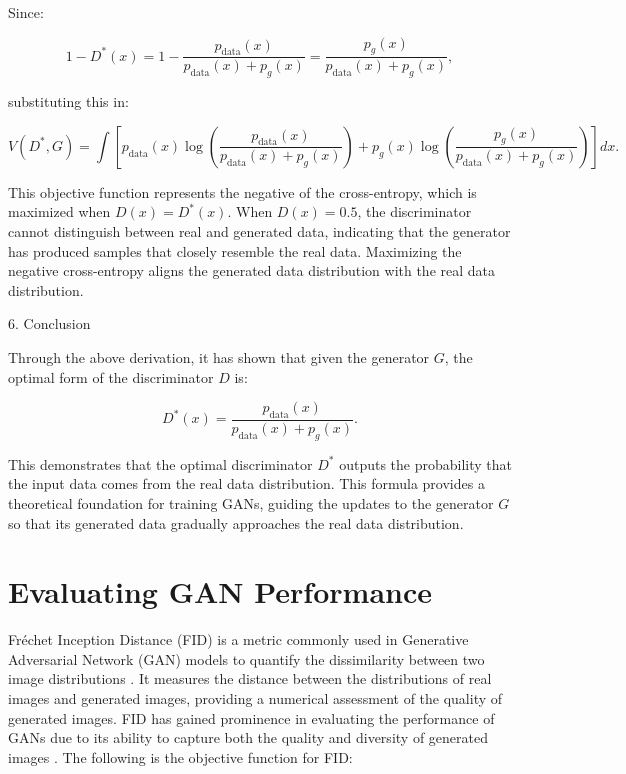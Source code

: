 Since:

\begin{equation}
    1 - D^*(x) = 1 - \frac{p_{\text{data}}(x)}{p_{\text{data}}(x) + p_g(x)} = \frac{p_g(x)}{p_{\text{data}}(x) + p_g(x)},
\end{equation}

substituting this in:

\begin{equation}
    V(D^*, G) = \int \left[ p_{\text{data}}(x) \log \left( \frac{p_{\text{data}}(x)}{p_{\text{data}}(x) + p_g(x)} \right) + p_g(x) \log \left( \frac{p_g(x)}{p_{\text{data}}(x) + p_g(x)} \right) \right] dx.
\end{equation}

This objective function represents the negative of the cross-entropy, which is maximized when $D(x) = D^*(x)$. When $D(x) = 0.5$, the discriminator cannot distinguish between real and generated data, indicating that the generator has produced samples that closely resemble the real data. Maximizing the negative cross-entropy aligns the generated data distribution with the real data distribution.

6. Conclusion

Through the above derivation, it has shown that given the generator \( G \), the optimal form of the discriminator \( D \) is:

\begin{equation}
    D^*(x) = \frac{p_{\text{data}}(x)}{p_{\text{data}}(x) + p_g(x)}.
\end{equation}

This demonstrates that the optimal discriminator \( D^* \) outputs the probability that the input data comes from the 
real data distribution. 
This formula provides a theoretical foundation for training GANs, guiding the updates to the generator \( G \) so that 
its generated data gradually approaches the real data distribution.


\section{Evaluating GAN Performance}


Fréchet Inception Distance (FID) is a metric commonly used in Generative Adversarial Network (GAN) models 
to quantify the dissimilarity between two image distributions \citep{10.48550/arxiv.2203.06026}. 
It measures the distance between the distributions of real images and generated images, providing 
a numerical assessment of the quality of generated images. FID has gained prominence in evaluating 
the performance of GANs due to its ability to capture both the quality and diversity of generated images \citep{10.3390/app12157599}.
The following is the objective function for FID:


